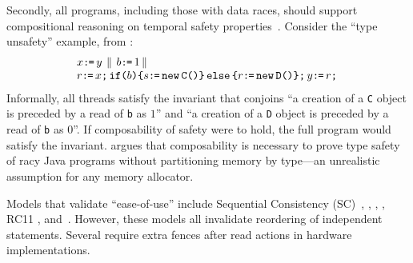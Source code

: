 Secondly, all programs, including those with data races,  should support compositional reasoning on temporal safety properties~\cite{PnueliSafety,Misra:1981:PNP:1313338.1313770,StarkSafety,Abadi:1993:CS:151646.151649}.
Consider the ``type unsafety'' example, from
\citep[Figure 8]{DBLP:journals/toplas/Lochbihler13}:
\begin{displaymath}
  \begin{array}[t]{l}
    x\texttt{:}\mkern-1mu\texttt{=}\, y
    \,\mathbin{\|}\,
    b \texttt{:}\mkern-1mu\texttt{=}\, 1   
    \,\mathbin{\|}\,\\
    r\texttt{:}\mkern-1mu\texttt{=}\, x \texttt{;}\,\allowbreak \texttt{if}\allowbreak\texttt{(}b\texttt{)} \allowbreak\texttt{\{} s \texttt{:}\mkern-1mu\texttt{=}\, \texttt{new}\, \texttt{C()} \texttt{\}}\,\allowbreak\texttt{else}\allowbreak\,\texttt{\{} r \texttt{:}\mkern-1mu\texttt{=}\, \texttt{new}\, \texttt{D()} \texttt{\}}  \texttt{;}\,\allowbreak y \texttt{:}\mkern-1mu\texttt{=}\, r \texttt{;}\,\allowbreak 
  \end{array}
\end{displaymath}
Informally, all threads satisfy the invariant that conjoins ``a creation of a \texttt{C} object is preceded by a read of \texttt{b} as $1$'' and ``a creation of a \texttt{D} object is preceded by a read of \texttt{b} as $0$''.  If composability of safety were to hold, the full program would satisfy the invariant.
\citeauthor{DBLP:journals/toplas/Lochbihler13} argues that composability is necessary to prove type safety of racy Java programs without partitioning memory by type---an unrealistic assumption for any memory allocator. %

Models that validate ``ease-of-use'' include Sequential Consistency (SC)~\citep{Lamport:1979:MMC:1311099.1311750}, \citep{Dolan:2018:BDR:3192366.3192421}, \citep{DBLP:conf/pldi/LahavVKHD17}, \citep{DBLP:conf/lics/JeffreyR16}, RC11 \citep{DBLP:conf/pldi/LahavVKHD17}, and~\citep{BoehmOOTA}.  However, these models all invalidate reordering of independent statements.  Several require extra fences after read actions in hardware implementations. %


